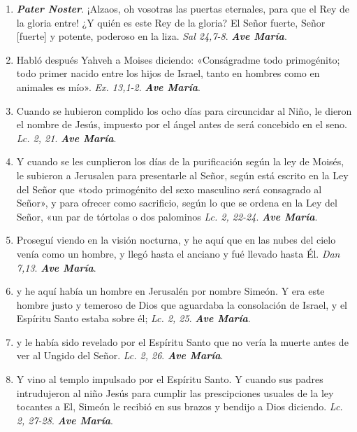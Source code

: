 \documentclass[../../devocionario.tex]{subfiles}
\begin{document}
    \begin{enumerate}
        \item \textbf{\textit{Pater Noster}}. ¡Alzaos, oh vosotras las puertas eternales, para que el Rey de la gloria entre!
            ¿Y quién es este Rey de la gloria? El Señor fuerte, Señor [fuerte] y potente, poderoso en la liza. \textit{Sal 24,7-8}. \textbf{\textit{Ave María}}.

        \item Habló después Yahveh a Moises diciendo: «Conságradme todo primogénito; todo primer nacido entre los hijos de Israel, tanto en hombres como en animales es mío». 
            \textit{Ex. 13,1-2}. \textbf{\textit{Ave María}}.

        \item Cuando se hubieron complido los ocho días para circuncidar al Niño, le dieron el nombre de Jesús, impuesto por el ángel antes de será concebido en el seno. 
            \textit{Lc. 2, 21}. \textbf{\textit{Ave María}}.

        \item Y cuando se les cunplieron los días de la purificación según la ley de Moisés, le subieron a Jerusalen para presentarle al Señor, 
            según está escrito en la Ley del Señor que «todo primogénito del sexo masculino será consagrado al Señor», 
            y para ofrecer como sacrificio, según lo que se ordena en la Ley del Señor, «un par de tórtolas o dos palominos \textit{Lc. 2, 22-24}. \textbf{\textit{Ave María}}.

        \item Proseguí viendo en la visión nocturna, y he aquí que en las nubes del cielo venía como un hombre, y llegó hasta el anciano y fué llevado hasta Él. 
            \textit{Dan 7,13}. \textbf{\textit{Ave María}}.

        \item y he aquí había un hombre en Jerusalén por nombre Simeón. Y era este hombre justo y temeroso de Dios que aguardaba la consolación de Israel, 
            y el Espíritu Santo estaba sobre él; \textit{Lc. 2, 25}. \textbf{\textit{Ave María}}.

        \item y le había sido revelado por el Espíritu Santo que no vería la muerte antes de ver al Ungido del Señor. \textit{Lc. 2, 26}. \textbf{\textit{Ave María}}.

        \item Y vino al templo impulsado por el Espíritu Santo. Y cuando sus padres intrudujeron al niño Jesús para cumplir 
            las prescipciones usuales de la ley tocantes a El, Simeón le recibió en sus brazos y bendijo a Dios diciendo. \textit{Lc. 2, 27-28}. \textbf{\textit{Ave María}}.


\end{enumerate}
\end{document}
